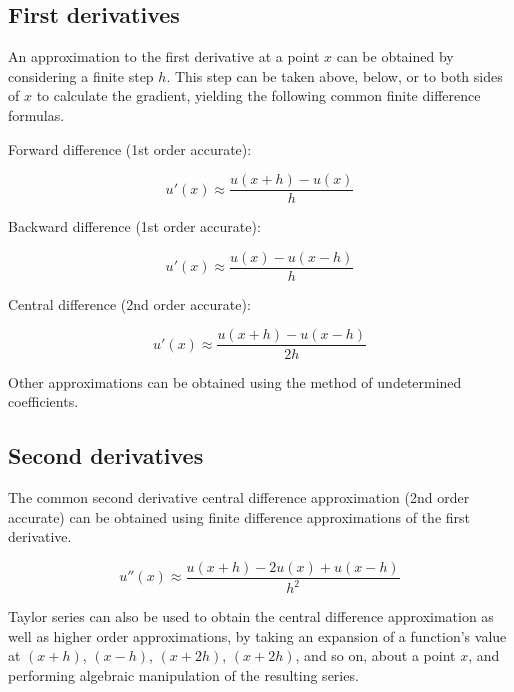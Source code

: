 \documentclass[12pt]{article}
\begin{document}
\subsection{First derivatives}

An approximation to the first derivative at a point $x$ can be obtained by considering a finite step $h$. This step can be taken above, below, or to both sides of $x$ to calculate the gradient, yielding the following common finite difference formulas.

\vspace{4mm}

Forward difference (1st order accurate):

\vspace{4mm}

$$u'(x) \approx \frac{u(x+h) - u(x)}{h}$$

\vspace{4mm}

Backward difference (1st order accurate):

\vspace{4mm}

$$u'(x) \approx \frac{u(x) - u(x-h)}{h}$$

\vspace{4mm}

Central difference (2nd order accurate):

\vspace{4mm}

$$u'(x) \approx \frac{u(x+h) - u(x-h)}{2h}$$

\vspace{4mm}

Other approximations can be obtained using the method of undetermined coefficients.

\subsection{Second derivatives}

The common second derivative central difference approximation (2nd order accurate) can be obtained using finite difference approximations of the first derivative.

\vspace{4mm}

$$u''(x) \approx \frac{u(x+h) - 2u(x) + u(x-h)}{h^2}$$

\vspace{4mm}

Taylor series can also be used to obtain the central difference approximation as well as higher order approximations, by taking an expansion of a function's value at $(x+h)$, $(x-h)$, $(x+2h)$, $(x+2h)$, and so on, about a point $x$, and performing algebraic manipulation of the resulting series. 
\end{document}
